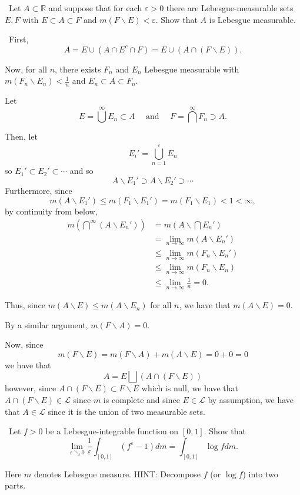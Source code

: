 \documentclass[12pt]{Homework}
\begin{document}
\begin{problem} $\,$
Let $A\subset\mathbb{R}$ and suppose that for each $\varepsilon>0$ there are Lebesgue-measurable sets $E,F$ with $E\subset A\subset F$ and $m(F\backslash E)<\varepsilon.$ Show that $A$ is Lebesgue measurable.
\end{problem}


\begin{solution}$\,$
First, $$A=E\cup(A\cap E^c\cap F)=E\cup(A\cap(F\backslash E)).$$

Now, for all $n$, there exists $F_n$ and $E_n$ Lebesgue measurable with $m(F_n\backslash E_n)<\frac{1}{n}$ and $E_n\subset A\subset F_n.$

Let $$E=\bigcup^\infty E_n\subset A\quad\text{ and }\quad F=\bigcap^\infty F_n\supset A.$$

Then, let $$E_i'=\bigcup^i_{n=1}E_n$$ so $E_1'\subset E_2'\subset\cdots$ and so $$A\backslash E_1'\supset A\backslash E_2'\supset \cdots$$ Furthermore, since $$m(A\backslash E_1')\le m(F_1\backslash E_1')=m(F_1\backslash E_1)<1<\infty,$$ by continuity from below, \begin{align*}
    m(\bigcap^\infty(A\backslash E_n'))&=m(A\backslash\bigcap E_n')\\
    &=\lim_{n\to\infty}m(A\backslash E_n')\\
    &\le\lim_{n\to\infty}m(F_n\backslash E_n')\\
    &\le\lim_{n\to\infty}m(F_n\backslash E_n)\\
    &\le\lim_{n\to\infty}\frac{1}{n}=0.
\end{align*}

Thus, since $m(A\backslash E)\le m(A\backslash E_n)$ for all $n$, we have that $m(A\backslash E)=0$.

By a similar argument, $m(F\backslash A)=0$.

Now, since $$m(F\backslash E)=m(F\backslash A)+m(A\backslash E)=0+0=0$$ we have that $$A=E\bigsqcup(A\cap (F\backslash E))$$ however, since $A\cap(F\backslash E)\subset F\backslash E$ which is null, we have that $A\cap (F\backslash E)\in\mathscr{L}$ since $m$ is complete and since $E\in\mathscr{L}$ by assumption, we have that $A\in\mathscr{L}$ since it is the union of two measurable sets.
\end{solution}
\newpage

\begin{problem} $\,$
Let $f>0$ be a Lebesgue-integrable function on $[0,1]$. Show that $$\lim_{\varepsilon\searrow0}\frac{1}{\varepsilon}\int_{[0,1]}(f^\varepsilon-1)dm=\int_{[0,1]}\log fdm.$$

Here $m$ denotes Lebesgue measure. HINT: Decompose $f$ (or $\log f$) into two parts.
\end{problem}
\end{document}
